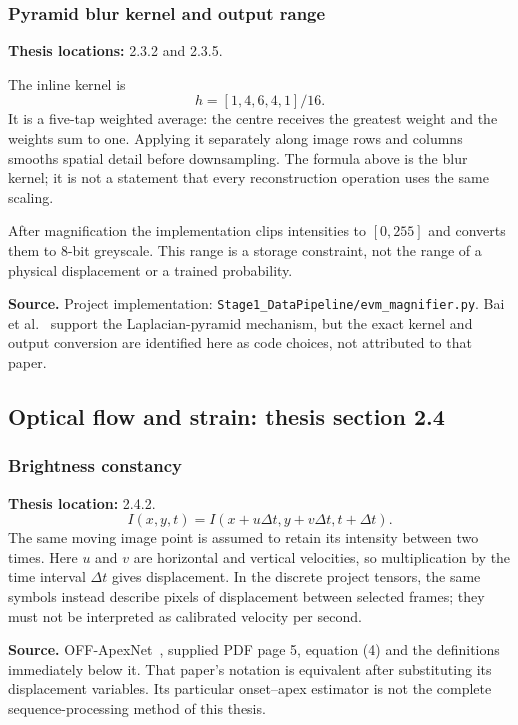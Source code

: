 \documentclass[11pt,a4paper]{article}
\numberwithin{equation}{section}
\begin{document}
\subsubsection{Pyramid blur kernel and output range}
\label{fg:pyramid}
\textbf{Thesis locations:} 2.3.2 and 2.3.5.

The inline kernel is
\begin{equation}
    h=[1,4,6,4,1]/16.
    \label{fg:eq:blur}
\end{equation}
It is a five-tap weighted average: the centre receives the greatest weight and
the weights sum to one. Applying it separately along image rows and columns
smooths spatial detail before downsampling. The formula above is the blur
kernel; it is not a statement that every reconstruction operation uses the
same scaling.

\label{fg:clip}
After magnification the implementation clips intensities to $[0,255]$ and
converts them to 8-bit greyscale. This range is a storage constraint, not the
range of a physical displacement or a trained probability.

\textbf{Source.} Project implementation:
\texttt{Stage1\_DataPipeline/evm\_magnifier.py}. Bai et al.~\cite{bai2021}
support the Laplacian-pyramid mechanism, but the exact kernel and output
conversion are identified here as code choices, not attributed to that paper.

\subsection{Optical flow and strain: thesis section 2.4}

\subsubsection{Brightness constancy}
\label{fg:flow}
\textbf{Thesis location:} 2.4.2.
\begin{equation}
    I(x,y,t)=I(x+u\Delta t,y+v\Delta t,t+\Delta t).
    \label{fg:eq:brightness}
\end{equation}
The same moving image point is assumed to retain its intensity between two
times. Here $u$ and $v$ are horizontal and vertical velocities, so multiplication
by the time interval $\Delta t$ gives displacement. In the discrete project
tensors, the same symbols instead describe pixels of displacement between
selected frames; they must not be interpreted as calibrated velocity per second.

\textbf{Source.} OFF-ApexNet~\cite{liong2019a}, supplied PDF page 5,
equation (4) and the definitions immediately below it. That paper's notation is
equivalent after substituting its displacement variables. Its particular
onset--apex estimator is not the complete sequence-processing method of this thesis.
\end{document}
